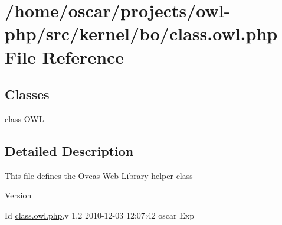 \section{/home/oscar/projects/owl-\/php/src/kernel/bo/class.owl.php File Reference}
\label{class_8owl_8php}
\subsection*{Classes}
\begin{DoxyCompactItemize}
\item 
class \hyperlink{classOWL}{OWL}
\end{DoxyCompactItemize}


\subsection{Detailed Description}
This file defines the Oveas Web Library helper class \begin{DoxyVersion}{Version}

\end{DoxyVersion}
\begin{DoxyParagraph}{Id}
\hyperlink{class_8owl_8php}{class.owl.php},v 1.2 2010-\/12-\/03 12:07:42 oscar Exp 
\end{DoxyParagraph}
